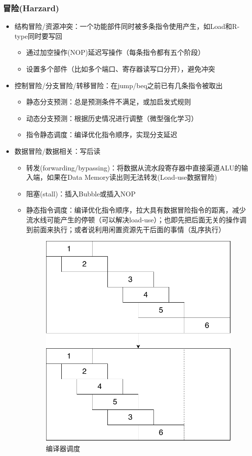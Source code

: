 \subsubsection{冒险(Harzard)}
\begin{itemize}
	\item 结构冒险/资源冲突：一个功能部件同时被多条指令使用产生，如Load和R-type同时要写回
	\begin{itemize}
		\item 通过加空操作(NOP)延迟写操作（每条指令都有五个阶段）
		\item 设置多个部件（比如多个端口、寄存器读写口分开），避免冲突
	\end{itemize}
	\item 控制冒险/分支冒险/转移冒险：在jump/beq之前已有几条指令被取出
	\begin{itemize}
		\item 静态分支预测：总是预测条件不满足，或加启发式规则
		\item 动态分支预测：根据历史情况进行调整（微型强化学习）
		\item 指令静态调度：编译优化指令顺序，实现分支延迟
	\end{itemize}
	\item 数据冒险/数据相关：写后读
	\begin{itemize}
		\item 转发(forwarding/bypassing)：将数据从流水段寄存器中直接渠道ALU的输入端，如果在Data Memory读出则无法转发(Load-use数据冒险)
		\item 阻塞(stall)：插入Bubble或插入NOP
		\item 静态指令调度：编译优化指令顺序，拉大具有数据冒险指令的距离，减少流水线可能产生的停顿（可以解决load-use）；也即先把后面无关的操作调到前面来执行；或者说利用闲置资源先干后面的事情（乱序执行）%
		\begin{figure}[htbp]
		\centering
		\includegraphics[width=0.3\linewidth]{fig/schedule.pdf}
		\caption{编译器调度}
		\end{figure}
	\end{itemize}
\end{itemize}
